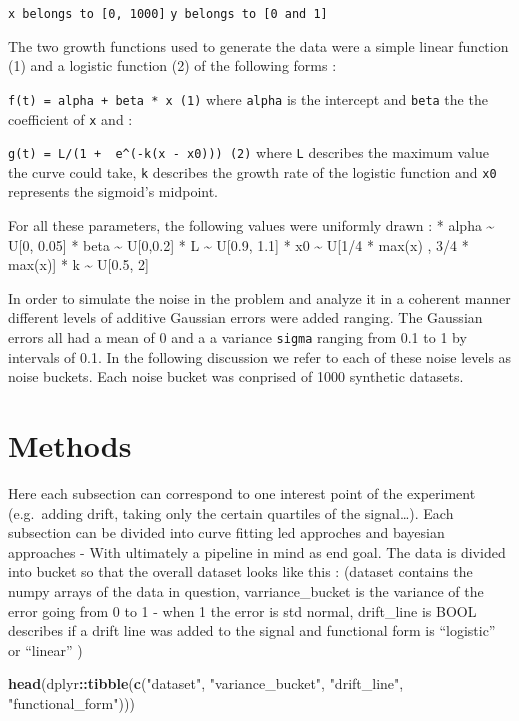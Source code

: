 \documentclass[]{article}
\newenvironment{Shaded}{\begin{snugshade}}{\end{snugshade}}
\newcommand{\KeywordTok}[1]{\textcolor[rgb]{0.13,0.29,0.53}{\textbf{#1}}}
\newcommand{\NormalTok}[1]{#1}
\newcommand{\OperatorTok}[1]{\textcolor[rgb]{0.81,0.36,0.00}{\textbf{#1}}}
\newcommand{\StringTok}[1]{\textcolor[rgb]{0.31,0.60,0.02}{#1}}
\begin{document}
\texttt{x\ belongs\ to\ {[}0,\ 1000{]}}
\texttt{y\ belongs\ to\ {[}0\ and\ 1{]}}

The two growth functions used to generate the data were a simple linear
function (1) and a logistic function (2) of the following forms :

\texttt{f(t)\ =\ alpha\ +\ beta\ *\ x\ (1)} where \texttt{alpha} is the
intercept and \texttt{beta} the the coefficient of \texttt{x} and :

\texttt{g(t)\ =\ L/(1\ +\ \ e\^{}(-k(x\ -\ x0)))\ (2)} where \texttt{L}
describes the maximum value the curve could take, \texttt{k} describes
the growth rate of the logistic function and \texttt{x0} represents the
sigmoid's midpoint.

For all these parameters, the following values were uniformly drawn : *
alpha \textasciitilde{} U{[}0, 0.05{]} * beta \textasciitilde{}
U{[}0,0.2{]} * L \textasciitilde{} U{[}0.9, 1.1{]} * x0
\textasciitilde{} U{[}1/4 * max(x) , 3/4 * max(x){]} * k
\textasciitilde{} U{[}0.5, 2{]}

In order to simulate the noise in the problem and analyze it in a
coherent manner different levels of additive Gaussian errors were added
ranging. The Gaussian errors all had a mean of 0 and a a variance
\texttt{sigma} ranging from 0.1 to 1 by intervals of 0.1. In the
following discussion we refer to each of these noise levels as noise
buckets. Each noise bucket was conprised of 1000 synthetic datasets.

\hypertarget{methods}{%
\section{Methods}\label{methods}}

Here each subsection can correspond to one interest point of the
experiment (e.g.~adding drift, taking only the certain quartiles of the
signal\ldots{}). Each subsection can be divided into curve fitting led
approches and bayesian approaches - With ultimately a pipeline in mind
as end goal. The data is divided into bucket so that the overall dataset
looks like this : (dataset contains the numpy arrays of the data in
question, varriance\_bucket is the variance of the error going from 0 to
1 - when 1 the error is std normal, drift\_line is BOOL describes if a
drift line was added to the signal and functional form is ``logistic''
or ``linear'' )

\begin{Shaded}
\begin{Highlighting}[]
\KeywordTok{head}\NormalTok{(dplyr}\OperatorTok{::}\KeywordTok{tibble}\NormalTok{(}\KeywordTok{c}\NormalTok{(}\StringTok{"dataset"}\NormalTok{, }\StringTok{"variance_bucket"}\NormalTok{, }\StringTok{"drift_line"}\NormalTok{, }\StringTok{"functional_form"}\NormalTok{)))}
\end{Highlighting}
\end{Shaded}
\end{document}
